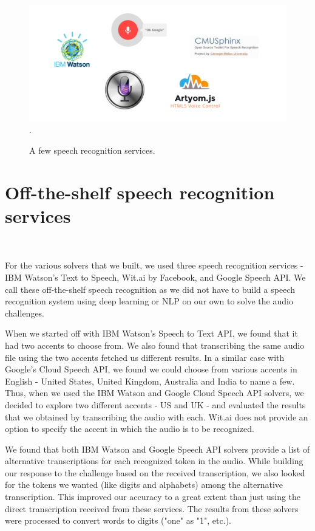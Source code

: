 \begin{figure}[t]
   \centering
   \includegraphics[width=\columnwidth]{figures/Picture2.png}.
   \caption{A few speech recognition services.}
   \label{fig:speechrecognizers}
\end{figure}
\section{Off-the-shelf speech recognition services} \mbox{} \
\label{sec:previous}

For the various solvers that we built, we used three speech recognition services - IBM Watson's Text to Speech, Wit.ai by Facebook, and Google Speech API. We call these off-the-shelf speech recognition as we did not have to build a speech recognition system using deep learning or NLP on our own to solve the audio challenges.\newline

When we started off with IBM Watson's Speech to Text API, we found that it had two accents to choose from. We also found that transcribing the same audio file using the two accents fetched us different results. In a similar case with Google's Cloud Speech API, we found we could choose from various accents in English - United States, United Kingdom, Australia and India to name a few. Thus, when we used the IBM Watson and Google Cloud Speech API solvers, we decided to explore two different accents - US and UK - and evaluated the results that we obtained by transcribing the audio with each. Wit.ai does not provide an option to specify the accent in which the audio is to be recognized. \newline

We found that both IBM Watson and Google Speech API solvers provide a list of alternative transcriptions for each recognized token in the audio. While building our response to the challenge based on the received transcription, we also looked for the tokens we wanted (like digits and alphabets) among the alternative transcription. This improved our accuracy to a great extent than just using the direct transcription received from these services. The results from these solvers were processed to convert words to digits ("one" as "1", etc.).\newline

